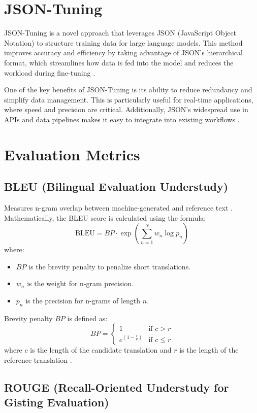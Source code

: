 \section{JSON-Tuning}

JSON-Tuning is a novel approach that leverages JSON (JavaScript Object Notation) to structure training data for large language models. This method improves accuracy and efficiency by taking advantage of JSON's hierarchical format, which streamlines how data is fed into the model and reduces the workload during fine-tuning \cite{zheng2024llamafactory}.

One of the key benefits of JSON-Tuning is its ability to reduce redundancy and simplify data management. This is particularly useful for real-time applications, where speed and precision are critical. Additionally, JSON's widespread use in APIs and data pipelines makes it easy to integrate into existing workflows \cite{zhu2024lift}.

\section{Evaluation Metrics}
\subsection{BLEU (Bilingual Evaluation Understudy)\cite{Reiter2018A}}

Measures n-gram overlap between machine-generated and reference text \cite{Reiter2018A}. Mathematically, the BLEU score is calculated using the formula:
\[
\text{BLEU} = BP \cdot \exp \left( \sum_{n=1}^{N} w_n \log p_n \right)
\]
where:
\begin{itemize}
    \item \( BP \) is the brevity penalty to penalize short translations.
    \item \( w_n \) is the weight for n-gram precision.
    \item \( p_n \) is the precision for n-grams of length \( n \).
\end{itemize}

Brevity penalty \( BP \) is defined as:
\[
BP = 
\begin{cases} 
1 & \text{if } c > r \\
e^{(1-\frac{r}{c})} & \text{if } c \leq r 
\end{cases}
\]
where \( c \) is the length of the candidate translation and \( r \) is the length of the reference translation \cite{Reiter2018A}.

\subsection{ROUGE (Recall-Oriented Understudy for Gisting Evaluation) \cite{Ganesan2015ROUGE}} 

